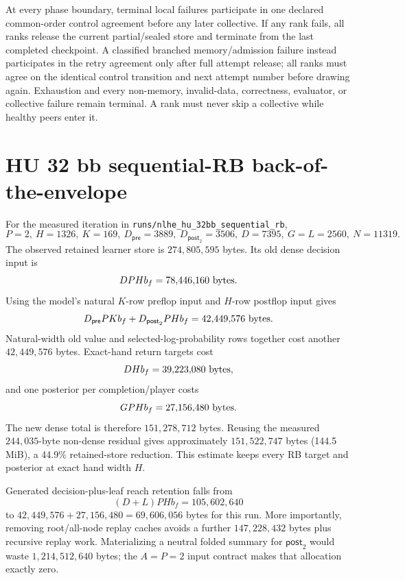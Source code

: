 \documentclass[10pt,a4paper]{article}
\begin{document}
At every phase boundary, terminal local failures participate in one declared
common-order control agreement before any later collective.  If any rank
fails, all ranks release the current partial/sealed store and terminate from
the last completed checkpoint.  A classified branched memory/admission failure
instead participates in the retry agreement only after full attempt release;
all ranks must agree on the identical control transition and next attempt
number before drawing again.  Exhaustion and every non-memory, invalid-data,
correctness, evaluator, or collective failure remain terminal.  A rank must
never skip a collective while healthy peers enter it.

\section{HU 32 bb sequential-RB back-of-the-envelope}

For the measured iteration in
\texttt{runs/nlhe\_hu\_32bb\_sequential\_rb},
\[
 P=2,\ H=1326,\ K=169,\ D_{\mathsf{pre}}=3889,\
 D_{\mathsf{post}_2}=3506,\ D=7395,\ G=L=2560,\ N=11319.
\]
The observed retained learner store is $274{,}805{,}595$ bytes.  Its old dense
decision input is
\[
 DPHb_f=78{,}446{,}160\ \textnormal{bytes}.
\]
Using the model's natural $K$-row preflop input and $H$-row postflop input gives
\[
 D_{\mathsf{pre}}PKb_f+D_{\mathsf{post}_2}PHb_f
 =42{,}449{,}576\ \textnormal{bytes}.
\]
Natural-width old value and selected-log-probability rows together cost another
$42{,}449{,}576$ bytes.  Exact-hand return targets cost
\[
 DHb_f=39{,}223{,}080\ \textnormal{bytes},
\]
and one posterior per completion/player costs
\[
 GPHb_f=27{,}156{,}480\ \textnormal{bytes}.
\]
The new dense total is therefore $151{,}278{,}712$ bytes.  Reusing the measured
$244{,}035$-byte non-dense residual gives approximately
$151{,}522{,}747$ bytes (144.5 MiB), a 44.9\% retained-store reduction.  This
estimate keeps every RB target and posterior at exact hand width $H$.

Generated decision-plus-leaf reach retention falls from
\[
 (D+L)PHb_f=105{,}602{,}640
\]
to $42{,}449{,}576+27{,}156{,}480=69{,}606{,}056$ bytes for this run.  More
importantly, removing root/all-node replay caches avoids a further
$147{,}228{,}432$ bytes plus recursive replay work.  Materializing a neutral
folded summary for $\mathsf{post}_2$ would waste $1{,}214{,}512{,}640$ bytes;
the $A=P=2$ input contract makes that allocation exactly zero.
\end{document}
